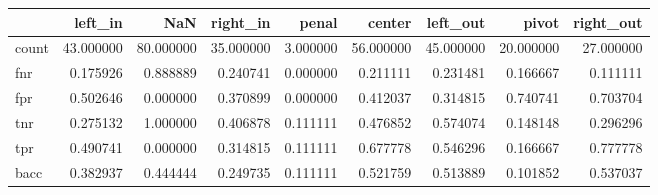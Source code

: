 \begin{tabular}{lrrrrrrrr}
\toprule
{} &    left\_in &        NaN &   right\_in &     penal &     center &   left\_out &      pivot &  right\_out \\
\midrule
count &  43.000000 &  80.000000 &  35.000000 &  3.000000 &  56.000000 &  45.000000 &  20.000000 &  27.000000 \\
fnr   &   0.175926 &   0.888889 &   0.240741 &  0.000000 &   0.211111 &   0.231481 &   0.166667 &   0.111111 \\
fpr   &   0.502646 &   0.000000 &   0.370899 &  0.000000 &   0.412037 &   0.314815 &   0.740741 &   0.703704 \\
tnr   &   0.275132 &   1.000000 &   0.406878 &  0.111111 &   0.476852 &   0.574074 &   0.148148 &   0.296296 \\
tpr   &   0.490741 &   0.000000 &   0.314815 &  0.111111 &   0.677778 &   0.546296 &   0.166667 &   0.777778 \\
bacc  &   0.382937 &   0.444444 &   0.249735 &  0.111111 &   0.521759 &   0.513889 &   0.101852 &   0.537037 \\
\bottomrule
\end{tabular}
